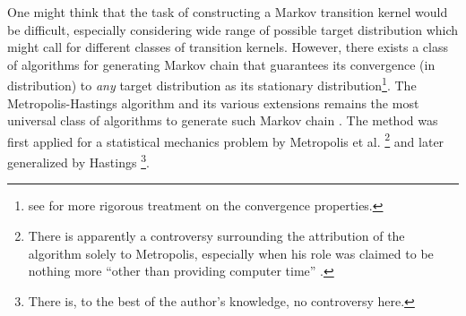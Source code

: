 One might think that the task of constructing a Markov transition kernel would be difficult,
especially considering wide range of possible target distribution which might call for different classes of transition kernels.
However, there exists a class of algorithms for generating Markov chain that guarantees its convergence (in distribution) to \emph{any} target distribution as its stationary distribution\footnote{see \cite{Robert2010,Geyer2011} for more rigorous treatment on the convergence properties.}.
The Metropolis-Hastings algorithm and its various extensions remains the most universal class of algorithms to generate such Markov chain \cite{Robert2010}. 
The method was first applied for a statistical mechanics problem by Metropolis et al. \cite{Metropolis1953}\footnote{There is apparently a controversy surrounding the attribution of the algorithm solely to Metropolis, especially when his role was claimed to be nothing more ``other than providing computer time'' \cite{Gubernatis2005}.}
and later generalized by Hastings \cite{Hastings1970}\footnote{There is, to the best of the author's knowledge, no controversy here.}.

